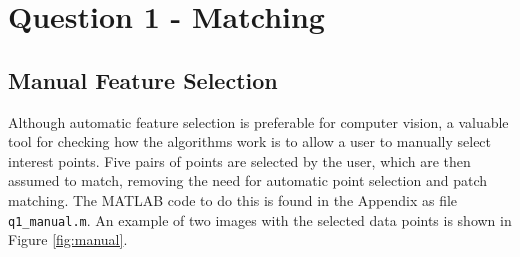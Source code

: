 \documentclass[a4paper, 10pt, conference]{ieeeconf}
\begin{document}
\section{Question 1 - Matching}

\subsection{Manual Feature Selection}

Although automatic feature selection is preferable for computer vision, a valuable tool for checking how the algorithms work is to allow a user to manually select interest points. Five pairs of points are selected by the user, which are then assumed to match, removing the need for automatic point selection and patch matching. The MATLAB code to do this is found in the Appendix as file \texttt{q1\_manual.m}. An example of two images with the selected data points is shown in Figure \ref{fig:manual}.
\end{document}
